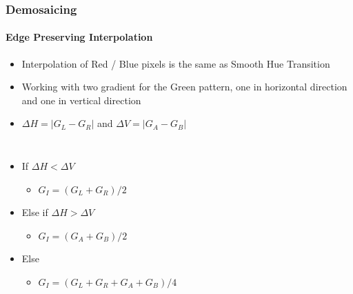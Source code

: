 \documentclass{beamer}
\begin{document}
\begin{frame}
\frametitle{Demosaicing}
\framesubtitle{Edge Preserving Interpolation}
\footnotesize{
\begin{itemize}
\item Interpolation of {\color{red} Red} / {\color{blue} Blue} pixels is the same as Smooth Hue Transition
\item Working with two gradient for the {\color{green} Green} pattern, one in horizontal direction and one in vertical direction
\item $ \Delta H = \vert G_{L} - G_{R}\vert $  and  $ \Delta V = \vert G_{A} - G_{B}  \vert $ 
\end{itemize}
}
\begin{columns}
\footnotesize{
\begin{itemize}
\item[] If $\Delta H < \Delta V$ 
\scriptsize{
\begin{itemize}
	\item[] $G_{I} = (G_{L}+G_{R})/2$
\end{itemize}
}
\item[] Else if $\Delta H > \Delta V$ 
\scriptsize{
\begin{itemize}
	\item[] $G_{I} = (G_{A}+G_{B})/2$
\end{itemize}
}
\item[] Else
\scriptsize{
\begin{itemize}
	\item[] $G_{I} = (G_{L}+G_{R}+G_{A}+G_{B})/4$
\end{itemize}
}
\end{itemize}
}
\end{columns}
\end{frame}
\end{document}
